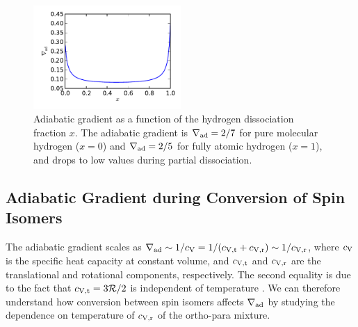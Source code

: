 \documentclass[apj]{emulateapj}
\newcommand{\delad}{\nabla_{\rm ad}}
\begin{document}
\begin{figure}[h]
\centering
\includegraphics[width=0.5\textwidth]{../../figs/ModelAtmospheres/RadSelfGravRealEOS/PaperFigs/delad_dissociation.pdf}
\caption{Adiabatic gradient as a function of the hydrogen dissociation fraction $x$. The adiabatic gradient is $\delad=2/7$ for pure molecular hydrogen ($x=0$) and $\delad=2/5$ for fully atomic hydrogen ($x=1$), and drops to low values during partial dissociation.}
\label{fig:deladdiss}
\end{figure}


\subsection{Adiabatic Gradient during Conversion of Spin Isomers}
\label{deladspin}

The adiabatic gradient scales as $\delad \sim 1/c_{\rm V}=1/(c_{\rm V,t}+c_{\rm V,r}) \sim 1/c_{\rm V, r}$, where $c_{\rm V}$ is the specific heat capacity at constant volume, and $c_{\rm V, t}$ and $c_{\rm V,r}$ are the translational and rotational components, respectively. The second equality is due to the fact that $c_{\rm V, t}=3\mathcal{R}/2$ is independent of temperature . We can therefore understand how conversion between spin isomers affects $\delad$ by studying the dependence on temperature of $c_{\rm V, r}$ of the ortho-para mixture. 
\end{document}
